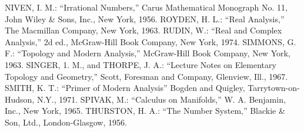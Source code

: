 \begin{thebibliography}{99.}
 NIVEN, I. M.: ``Irrational Numbers,'' Carus Mathematical Monograph No. 11, John Wiley \& Sons, Inc., New York, 1956.
 ROYDEN, H. L.: ``Real Analysis,'' The Macmillan Company, New York, 1963.
 RUDIN, W.: ``Real and Complex Analysis,'' 2d ed., McGraw-Hill Book Company, New York, 1974.
 SIMMONS, G. F.: ``Topology and Modern Analysis,'' McGraw-Hill Book Company, New York, 1963.
 SINGER, 1. M., and THORPE, J. A.: ``Lecture Notes on Elementary Topology and Geometry,'' Scott, Foresman and Company, Glenview, Ill., 1967.
 SMITH, K. T.: ``Primer of Modern Analysis'' Bogden and Quigley, Tarrytown-on-Hudson, N.Y., 1971.
 SPIVAK, M.: ``Calculus on Manifolds,'' W. A. Benjamin, Inc., New York, 1965.
 THURSTON, H. A.: ``The Number System,'' Blackie \& Son, Ltd., London-Glasgow, 1956.




\end{thebibliography}
